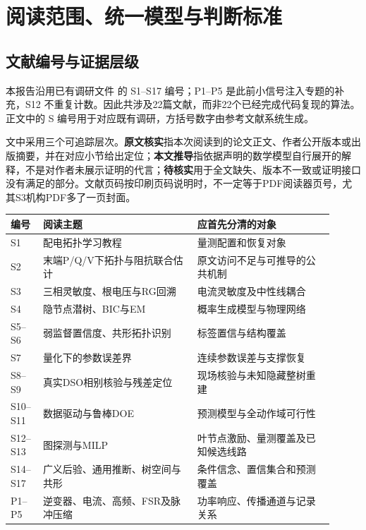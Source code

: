 \section{阅读范围、统一模型与判断标准}
\subsection{文献编号与证据层级}
本报告沿用已有调研文件  的 S1--S17 编号；P1--P5 是此前小信号注入专题的补充，S12 不重复计数。因此共涉及22篇文献，而非22个已经完成代码复现的算法。正文中的 S 编号用于对应既有调研，方括号数字由参考文献系统生成。

文中采用三个可追踪层次。\textbf{原文核实}指本次阅读到的论文正文、作者公开版本或出版摘要，并在对应小节给出定位；\textbf{本文推导}指依据声明的数学模型自行展开的解释，不是对作者未展示证明的代言；\textbf{待核实}用于全文缺失、版本不一致或证明接口没有满足的部分。文献页码按印刷页码说明时，不一定等于PDF阅读器页号，尤其S3机构PDF多了一页封面。

\begin{longtable}{p{0.08\linewidth}p{0.44\linewidth}p{0.39\linewidth}}
\toprule 编号 & 阅读主题 & 应首先分清的对象\\\midrule\endhead
S1 & 配电拓扑学习教程 & 量测配置和恢复对象\\
S2 & 末端P/Q/V下拓扑与阻抗联合估计 & 原文访问不足与可推导的公共机制\\
S3 & 三相灵敏度、根电压与RG回溯 & 电流灵敏度及中性线耦合\\
S4 & 隐节点潜树、BIC与EM & 概率生成模型与物理网络\\
S5--S6 & 弱监督置信度、共形拓扑识别 & 标签置信与结构覆盖\\
S7 & 量化下的参数误差界 & 连续参数误差与支撑恢复\\
S8--S9 & 真实DSO相别核验与残差定位 & 现场核验与未知隐藏整树重建\\
S10--S11 & 数据驱动与鲁棒DOE & 预测模型与全动作域可行性\\
S12--S13 & 图探测与MILP & 叶节点激励、量测覆盖及已知候选线路\\
S14--S17 & 广义后验、通用推断、树空间与共形 & 条件信念、置信集合和预测覆盖\\
P1--P5 & 逆变器、电流、高频、FSR及脉冲压缩 & 功率响应、传播通道与记录关系\\
\bottomrule
\end{longtable}

